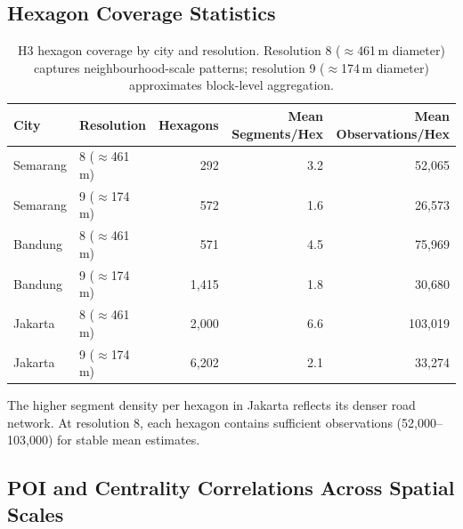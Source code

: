 \documentclass[preprint,12pt]{elsarticle}
\begin{document}
\subsection{Hexagon Coverage Statistics}

\begin{table}[!htbp]
\centering
\caption{H3 hexagon coverage by city and resolution. Resolution 8 ($\approx$461\,m diameter) captures neighbourhood-scale patterns; resolution 9 ($\approx$174\,m diameter) approximates block-level aggregation.}
\label{tab:s4}
\begin{tabular}{llrrr}
\toprule
City & Resolution & Hexagons & Mean Segments/Hex & Mean Observations/Hex \\
\midrule
Semarang & 8 ($\approx$461\,m) & 292 & 3.2 & 52,065 \\
Semarang & 9 ($\approx$174\,m) & 572 & 1.6 & 26,573 \\
Bandung  & 8 ($\approx$461\,m) & 571 & 4.5 & 75,969 \\
Bandung  & 9 ($\approx$174\,m) & 1,415 & 1.8 & 30,680 \\
Jakarta  & 8 ($\approx$461\,m) & 2,000 & 6.6 & 103,019 \\
Jakarta  & 9 ($\approx$174\,m) & 6,202 & 2.1 & 33,274 \\
\bottomrule
\end{tabular}
\end{table}

The higher segment density per hexagon in Jakarta reflects its denser road network. At resolution 8, each hexagon contains sufficient observations (52,000--103,000) for stable mean estimates.

\subsection{POI and Centrality Correlations Across Spatial Scales}
\end{document}
